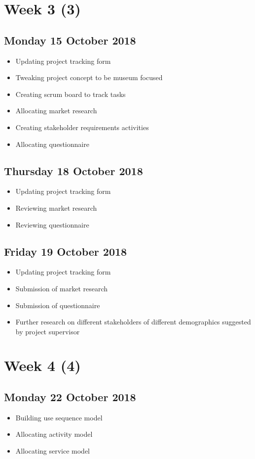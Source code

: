 \section*{Week 3 (3)}
\subsection*{Monday 15 October 2018}
\begin{itemize}
    \item Updating project tracking form
	\item Tweaking project concept to be museum focused 
	\item Creating scrum board to track tasks
	\item Allocating market research
    \item Creating stakeholder requirements activities
	\item Allocating questionnaire
\end{itemize}

\subsection*{Thursday 18 October 2018}
\begin{itemize}
	\item Updating project tracking form
	\item Reviewing market research
	\item Reviewing questionnaire
\end{itemize}

\subsection*{Friday 19 October 2018}
\begin{itemize}
    \item Updating project tracking form
	\item Submission of market research
	\item Submission of questionnaire
	\item Further research on different stakeholders of different demographics suggested by project supervisor
\end{itemize}

\section*{Week 4 (4)}
\subsection*{Monday 22 October 2018}
\begin{itemize}
    \item Building use sequence model
	\item Allocating activity model
	\item Allocating service model
\end{itemize}

